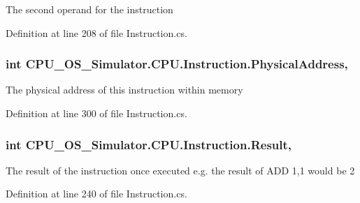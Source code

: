 The second operand for the instruction 



Definition at line 208 of file Instruction.\+cs.

\hypertarget{class_c_p_u___o_s___simulator_1_1_c_p_u_1_1_instruction_a97b20c8a0a7536bdddd8e791605a8bac}{}
\subsubsection[{Physical\+Address}]{\setlength{\rightskip}{0pt plus 5cm}int C\+P\+U\+\_\+\+O\+S\+\_\+\+Simulator.\+C\+P\+U.\+Instruction.\+Physical\+Address\hspace{0.3cm}{\ttfamily [get]}, {\ttfamily [set]}}\label{class_c_p_u___o_s___simulator_1_1_c_p_u_1_1_instruction_a97b20c8a0a7536bdddd8e791605a8bac}


The physical address of this instruction within memory 



Definition at line 300 of file Instruction.\+cs.

\hypertarget{class_c_p_u___o_s___simulator_1_1_c_p_u_1_1_instruction_a8e0f7c63850af7cfd8a41c066c01838e}{}
\subsubsection[{Result}]{\setlength{\rightskip}{0pt plus 5cm}int C\+P\+U\+\_\+\+O\+S\+\_\+\+Simulator.\+C\+P\+U.\+Instruction.\+Result\hspace{0.3cm}{\ttfamily [get]}, {\ttfamily [set]}}\label{class_c_p_u___o_s___simulator_1_1_c_p_u_1_1_instruction_a8e0f7c63850af7cfd8a41c066c01838e}


The result of the instruction once executed e.\+g. the result of A\+D\+D 1,1 would be 2 



Definition at line 240 of file Instruction.\+cs.

